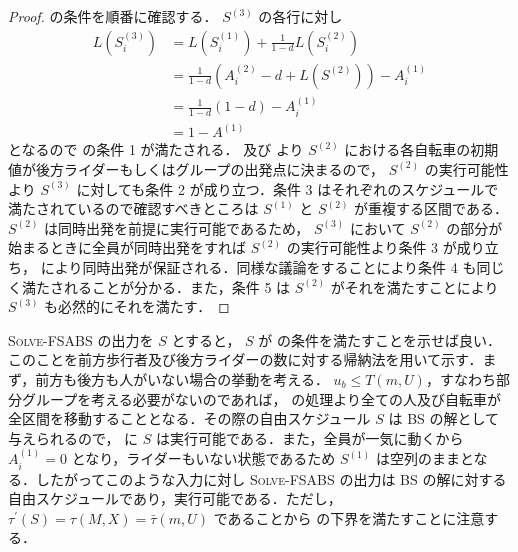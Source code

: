 \begin{proof}
   の条件を順番に確認する． $S^{(3)}$ の各行に対し
  \begin{align}
    L(S^{(3)}_i) &= L(S^{(1)}_i) + \frac{1}{1 - d}L(S^{(2)}_i) \\
                 &= \frac{1}{1 - d}(A^{(2)}_i - d + L(S^{(2)})) - A^{(1)}_i \\
                 &= \frac{1}{1 - d}(1 - d) - A^{(1)}_i \\
                 &= 1 - A^{(1)}
  \end{align}
  となるので  の条件 1 が満たされる．  及び  より $S^{(2)}$ における各自転車の初期値が後方ライダーもしくはグループの出発点に決まるので， $S^{(2)}$ の実行可能性より $S^{(3)}$ に対しても条件 2 が成り立つ．条件 3 はそれぞれのスケジュールで満たされているので確認すべきところは $S^{(1)}$ と $S^{(2)}$ が重複する区間である． $S^{(2)}$ は同時出発を前提に実行可能であるため， $S^{(3)}$ において $S^{(2)}$ の部分が始まるときに全員が同時出発をすれば $S^{(2)}$ の実行可能性より条件 3 が成り立ち，  により同時出発が保証される．同様な議論をすることにより条件 4 も同じく満たされることが分かる．また，条件 5 は $S^{(2)}$ がそれを満たすことにより $S^{(3)}$ も必然的にそれを満たす．
\end{proof}

\textsc{Solve-FSABS} の出力を $S$ とすると， $S$ が  の条件を満たすことを示せば良い．このことを前方歩行者及び後方ライダーの数に対する帰納法を用いて示す．まず，前方も後方も人がいない場合の挙動を考える． $u_b \leq T(m, U)$，すなわち部分グループを考える必要がないのであれば，  の処理より全ての人及び自転車が全区間を移動することとなる．その際の自由スケジュール $S$ は BS の解として与えられるので，  に $S$ は実行可能である．また，全員が一気に動くから $A^{(1)}_i = 0$ となり，ライダーもいない状態であるため $S^{(1)}$ は空列のままとなる．したがってこのような入力に対し \textsc{Solve-FSABS} の出力は BS の解に対する自由スケジュールであり，実行可能である．ただし， $\tau^\prime(S) = \tau(M, X) = \bar\tau(m, U)$ であることから  の下界を満たすことに注意する．

